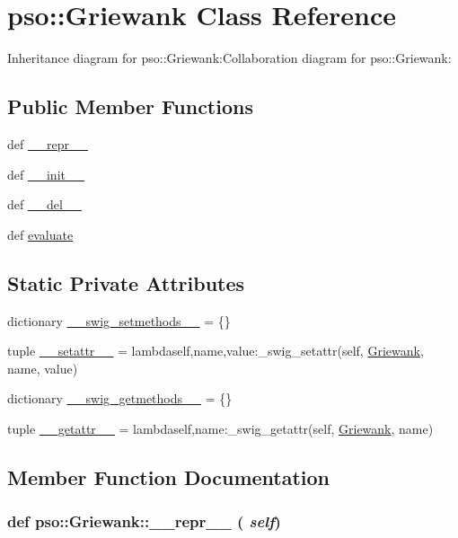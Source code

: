 \hypertarget{classpso_1_1Griewank}{
\section{pso::Griewank Class Reference}
\label{classpso_1_1Griewank}
}
Inheritance diagram for pso::Griewank:Collaboration diagram for pso::Griewank:\subsection*{Public Member Functions}
\begin{CompactItemize}
\item 
def \hyperlink{classpso_1_1Griewank_511aaa7b5b0c146773011fc3d889e43f}{\_\-\_\-repr\_\-\_\-}
\item 
def \hyperlink{classpso_1_1Griewank_c84ac13db6c58cd5ca948ba0340ab4f8}{\_\-\_\-init\_\-\_\-}
\item 
def \hyperlink{classpso_1_1Griewank_de940e1ba1459422e6e012a71a09f14b}{\_\-\_\-del\_\-\_\-}
\item 
def \hyperlink{classpso_1_1Griewank_13250cfc11071d8fd3bf65a5eb69f397}{evaluate}
\end{CompactItemize}
\subsection*{Static Private Attributes}
\begin{CompactItemize}
\item 
dictionary \hyperlink{classpso_1_1Griewank_9d6ac056840192478ec5f46980eb1231}{\_\-\_\-swig\_\-setmethods\_\-\_\-} = \{\}
\item 
tuple \hyperlink{classpso_1_1Griewank_bf26d6b7263a0aa9ebc00059a5cda5cc}{\_\-\_\-setattr\_\-\_\-} = lambdaself,name,value:\_\-swig\_\-setattr(self, \hyperlink{classpso_1_1Griewank}{Griewank}, name, value)
\item 
dictionary \hyperlink{classpso_1_1Griewank_df761ea1e5152ee4b7aec7de9f3b86c3}{\_\-\_\-swig\_\-getmethods\_\-\_\-} = \{\}
\item 
tuple \hyperlink{classpso_1_1Griewank_b73317e69a180eba6bef09b0317293be}{\_\-\_\-getattr\_\-\_\-} = lambdaself,name:\_\-swig\_\-getattr(self, \hyperlink{classpso_1_1Griewank}{Griewank}, name)
\end{CompactItemize}


\subsection{Member Function Documentation}
\hypertarget{classpso_1_1Griewank_511aaa7b5b0c146773011fc3d889e43f}{
\subsubsection{\setlength{\rightskip}{0pt plus 5cm}def pso::Griewank::\_\-\_\-repr\_\-\_\- ( {\em self})}}
\label{classpso_1_1Griewank_511aaa7b5b0c146773011fc3d889e43f}




